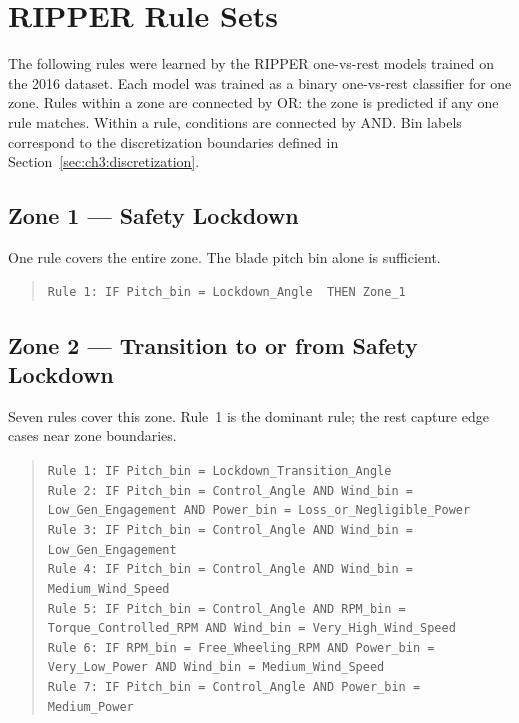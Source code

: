 
\chapter{RIPPER Rule Sets}
{\small
\label{app:rules}

The following rules were learned by the RIPPER one-vs-rest models trained on the 2016
dataset. Each model was trained as a binary one-vs-rest classifier for one zone. Rules
within a zone are connected by OR: the zone is predicted if any one rule matches. Within
a rule, conditions are connected by AND. Bin labels correspond to the discretization
boundaries defined in Section~\ref{sec:ch3:discretization}.

\section*{Zone 1 --- Safety Lockdown}
One rule covers the entire zone. The blade pitch bin alone is sufficient.
\begin{quote}
\texttt{Rule 1: IF Pitch\_bin = Lockdown\_Angle\ \ THEN Zone\_1}
\end{quote}

\section*{Zone 2 --- Transition to or from Safety Lockdown}
Seven rules cover this zone. Rule~1 is the dominant rule; the rest capture edge cases
near zone boundaries.
\begin{quote}
\texttt{Rule 1: IF Pitch\_bin = Lockdown\_Transition\_Angle}\\
\texttt{Rule 2: IF Pitch\_bin = Control\_Angle AND Wind\_bin = Low\_Gen\_Engagement AND Power\_bin = Loss\_or\_Negligible\_Power}\\
\texttt{Rule 3: IF Pitch\_bin = Control\_Angle AND Wind\_bin = Low\_Gen\_Engagement}\\
\texttt{Rule 4: IF Pitch\_bin = Control\_Angle AND Wind\_bin = Medium\_Wind\_Speed}\\
\texttt{Rule 5: IF Pitch\_bin = Control\_Angle AND RPM\_bin = Torque\_Controlled\_RPM AND Wind\_bin = Very\_High\_Wind\_Speed}\\
\texttt{Rule 6: IF RPM\_bin = Free\_Wheeling\_RPM AND Power\_bin = Very\_Low\_Power AND Wind\_bin = Medium\_Wind\_Speed}\\
\texttt{Rule 7: IF Pitch\_bin = Control\_Angle AND Power\_bin = Medium\_Power}
\end{quote}

}
